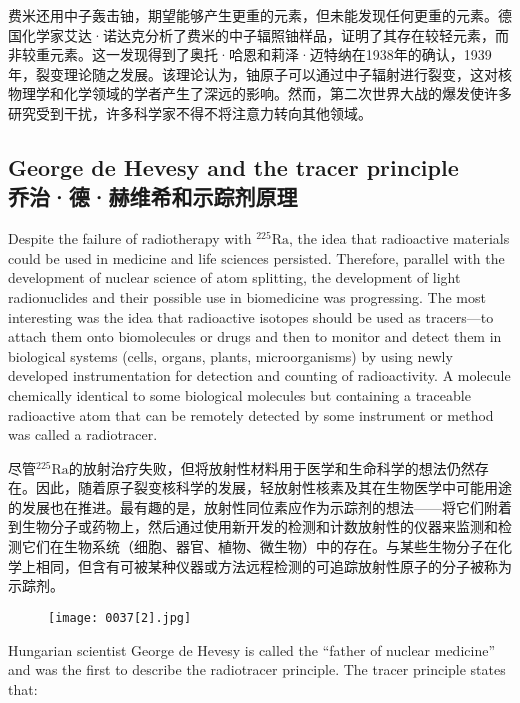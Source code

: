 \documentclass[dvipsnames, svgnames,a4paper,11pt]{article}
\begin{document}
费米还用中子轰击铀，期望能够产生更重的元素，但未能发现任何更重的元素。德国化学家艾达·诺达克分析了费米的中子辐照铀样品，证明了其存在较轻元素，而非较重元素。这一发现得到了奥托·哈恩和莉泽·迈特纳在1938年的确认，1939年，裂变理论随之发展。该理论认为，铀原子可以通过中子辐射进行裂变，这对核物理学和化学领域的学者产生了深远的影响。然而，第二次世界大战的爆发使许多研究受到干扰，许多科学家不得不将注意力转向其他领域。

\subsection{George de Hevesy and the tracer principle\\乔治·德·赫维希和示踪剂原理}
Despite the failure of radiotherapy with \(\mathrm{^{225}Ra}\), the idea that radioactive materials could be used in medicine and life sciences persisted. Therefore, parallel with the development of nuclear science of atom splitting, the development of light radionuclides and their possible use in biomedicine was progressing. The most interesting was the idea that radioactive isotopes should be used as tracers—to attach them onto biomolecules or drugs and then to monitor and detect them in biological systems (cells, organs, plants, microorganisms) by using newly developed instrumentation for detection and counting of radioactivity. A molecule chemically identical to some biological molecules but containing a traceable radioactive atom that can be remotely detected by some instrument or method was called a radiotracer.

尽管\(\mathrm{^{225}Ra}\)的放射治疗失败，但将放射性材料用于医学和生命科学的想法仍然存在。因此，随着原子裂变核科学的发展，轻放射性核素及其在生物医学中可能用途的发展也在推进。最有趣的是，放射性同位素应作为示踪剂的想法——将它们附着到生物分子或药物上，然后通过使用新开发的检测和计数放射性的仪器来监测和检测它们在生物系统（细胞、器官、植物、微生物）中的存在。与某些生物分子在化学上相同，但含有可被某种仪器或方法远程检测的可追踪放射性原子的分子被称为示踪剂。

\begin{figure}[htbp]
      \centering
      \texttt{[image: 0037[2].jpg]}
       \label{fig28}
\end{figure}

Hungarian scientist George de Hevesy is called the “father of nuclear medicine” and was the first to describe the radiotracer principle. The tracer principle states that:
\end{document}
